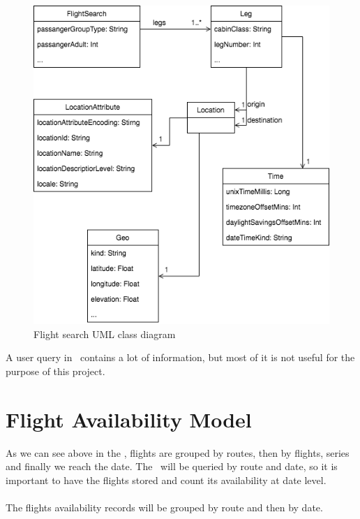 \begin{figure}[H]
\centering
\includegraphics[scale=0.6]{diagrams/flight_search.png}
\caption{Flight search UML class diagram}
\end{figure}

A user query in \company\ contains a lot of information, but most of it is not useful for the purpose of this project.


\section{Flight Availability Model}

As we can see above in the , flights are grouped by routes, then by flights, series and finally we reach the date. The \thesis\ will be queried by route and date, so it is important to have the flights stored and count its availability at date level.
\\\\
The flights availability records will be grouped by route and then by date.

